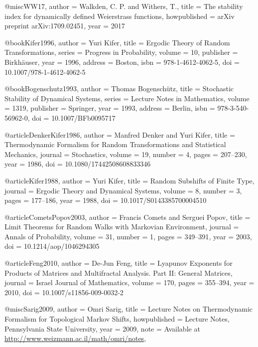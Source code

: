 @misc{WW17,
  author = {Walkden, C. P. and Withers, T.},
  title = {The stability index for dynamically defined Weierstrass functions},
  howpublished = {arXiv preprint arXiv:1709.02451},
  year = {2017}
}


@book{Kifer1996,
  author    = {Yuri Kifer},
  title     = {Ergodic Theory of Random Transformations},
  series    = {Progress in Probability},
  volume    = {10},
  publisher = {Birkhäuser},
  year      = {1996},
  address   = {Boston},
  isbn      = {978-1-4612-4062-5},
  doi       = {10.1007/978-1-4612-4062-5}
}

@book{Bogenschutz1993,
  author    = {Thomas Bogensch{\"u}tz},
  title     = {Stochastic Stability of Dynamical Systems},
  series    = {Lecture Notes in Mathematics},
  volume    = {1319},
  publisher = {Springer},
  year      = {1993},
  address   = {Berlin},
  isbn      = {978-3-540-56962-0},
  doi       = {10.1007/BFb0095717}
}

@article{DenkerKifer1986,
  author    = {Manfred Denker and Yuri Kifer},
  title     = {Thermodynamic Formalism for Random Transformations and Statistical Mechanics},
  journal   = {Stochastics},
  volume    = {19},
  number    = {4},
  pages     = {207--230},
  year      = {1986},
  doi       = {10.1080/17442508608833346}
}

@article{Kifer1988,
  author    = {Yuri Kifer},
  title     = {Random Subshifts of Finite Type},
  journal   = {Ergodic Theory and Dynamical Systems},
  volume    = {8},
  number    = {3},
  pages     = {177--186},
  year      = {1988},
  doi       = {10.1017/S0143385700004510}
}

@article{CometsPopov2003,
  author    = {Francis Comets and Serguei Popov},
  title     = {Limit Theorems for Random Walks with Markovian Environment},
  journal   = {Annals of Probability},
  volume    = {31},
  number    = {1},
  pages     = {349--391},
  year      = {2003},
  doi       = {10.1214/aop/1046294305}
}

@article{Feng2010,
  author    = {De-Jun Feng},
  title     = {Lyapunov Exponents for Products of Matrices and Multifractal Analysis. Part II: General Matrices},
  journal   = {Israel Journal of Mathematics},
  volume    = {170},
  pages     = {355--394},
  year      = {2010},
  doi       = {10.1007/s11856-009-0032-2}
}



@misc{Sarig2009,
  author       = {Omri Sarig},
  title        = {Lecture Notes on Thermodynamic Formalism for Topological Markov Shifts},
  howpublished = {Lecture Notes, Pennsylvania State University},
  year         = {2009},
  note         = {Available at \url{http://www.weizmann.ac.il/math/omri/notes}},
}


